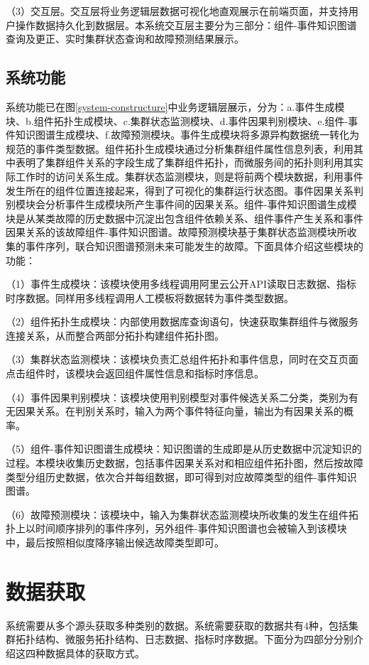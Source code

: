 （3）交互层。交互层将业务逻辑层数据可视化地直观展示在前端页面，并支持用户操作数据持久化到数据层。本系统交互层主要分为三部分：组件-事件知识图谱查询及更正、实时集群状态查询和故障预测结果展示。

\subsection{系统功能}\label{system-function}
系统功能已在图\ref{system-constructure}中业务逻辑层展示，分为：a.事件生成模块、b.组件拓扑生成模块、c.集群状态监测模块、d.事件因果判别模块、e.组件-事件知识图谱生成模块、f.故障预测模块。事件生成模块将多源异构数据统一转化为规范的事件类型数据。组件拓扑生成模块通过分析集群组件属性信息列表，利用其中表明了集群组件关系的字段生成了集群组件拓扑，而微服务间的拓扑则利用其实际工作时的访问关系生成。集群状态监测模块，则是将前两个模块数据，利用事件发生所在的组件位置连接起来，得到了可视化的集群运行状态图。事件因果关系判别模块会分析事件生成模块所产生事件间的因果关系。组件-事件知识图谱生成模块是从某类故障的历史数据中沉淀出包含组件依赖关系、组件事件产生关系和事件因果关系的该故障组件-事件知识图谱。故障预测模块基于集群状态监测模块所收集的事件序列，联合知识图谱预测未来可能发生的故障。下面具体介绍这些模块的功能：

（1）事件生成模块：该模块使用多线程调用阿里云公开API读取日志数据、指标时序数据。同样用多线程调用人工模板将数据转为事件类型数据。

（2）组件拓扑生成模块：内部使用数据库查询语句，快速获取集群组件与微服务连接关系，从而整合两部分拓扑构建组件拓扑图。

（3）集群状态监测模块：该模块负责汇总组件拓扑和事件信息，同时在交互页面点击组件时，该模块会返回组件属性信息和指标时序信息。

（4）事件因果判别模块：该模块使用判别模型对事件候选关系二分类，类别为有无因果关系。在判别关系时，输入为两个事件特征向量，输出为有因果关系的概率。

（5）组件-事件知识图谱生成模块：知识图谱的生成即是从历史数据中沉淀知识的过程。本模块收集历史数据，包括事件因果关系对和相应组件拓扑图，然后按故障类型分组历史数据，依次合并每组数据，即可得到对应故障类型的组件-事件知识图谱。

（6）故障预测模块：该模块中，输入为集群状态监测模块所收集的发生在组件拓扑上以时间顺序排列的事件序列，另外组件-事件知识图谱也会被输入到该模块中，最后按照相似度降序输出候选故障类型即可。


\section{数据获取}\label{data-collect-way}
系统需要从多个源头获取多种类别的数据。系统需要获取的数据共有4种，包括集群拓扑结构、微服务拓扑结构、日志数据、指标时序数据。下面分为四部分分别介绍这四种数据具体的获取方式。
